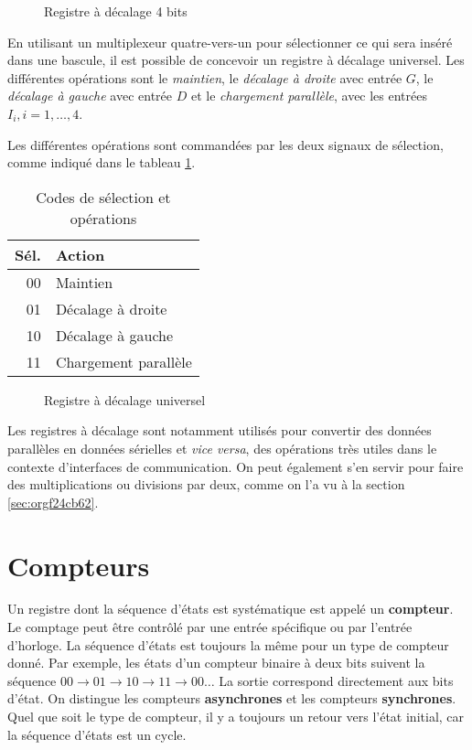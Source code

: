 \documentclass[letter, oneside]{book}
\begin{document}
\begin{enumerate}
\begin{figure}[htbp]
\centering

\caption{\label{fig:orgc7b21b4}Registre à décalage 4 bits}
\end{figure}

En utilisant un multiplexeur quatre-vers-un pour sélectionner ce qui
sera inséré dans une bascule, il est possible de concevoir un registre
à décalage universel. Les différentes opérations sont le \emph{maintien}, le
\emph{décalage à droite} avec entrée \(G\), le \emph{décalage à gauche} avec entrée
\(D\) et le \emph{chargement parallèle}, avec les entrées \(I_i, i=1, \ldots,
4\).

Les différentes opérations sont commandées par les deux signaux de
sélection, comme indiqué dans le tableau \ref{tab:org59d95c8}.

\begin{table}[htbp]
\caption{\label{tab:org59d95c8}Codes de sélection et opérations}
\centering
\begin{tabular}{rl}
Sél. & Action\\[0pt]
\hline
00 & Maintien\\[0pt]
01 & Décalage à droite\\[0pt]
10 & Décalage à gauche\\[0pt]
11 & Chargement parallèle\\[0pt]
\end{tabular}
\end{table}

\begin{figure}[htbp]
\centering

\caption{\label{fig:org26e0237}Registre à décalage universel}
\end{figure} 

Les registres à décalage sont notamment utilisés pour convertir des
données parallèles en données sérielles et \emph{vice versa}, des opérations
très utiles dans le contexte d'interfaces de communication. On peut
également s'en servir pour faire des multiplications ou divisions par
deux, comme on l'a vu à la section \ref{sec:orgf24cb62}.
\end{enumerate}

\section{Compteurs}
\label{sec:org4673aa3}

Un registre dont la séquence d'états est systématique est appelé un
\textbf{compteur}. Le comptage peut être contrôlé par une entrée spécifique
ou par l'entrée d'horloge. La séquence d'états est toujours la même
pour un type de compteur donné. Par exemple, les états d'un compteur
binaire à deux bits suivent la séquence \(00 \rightarrow 01
\rightarrow 10 \rightarrow 11 \rightarrow 00 \ldots\) La sortie
correspond directement aux bits d'état. On distingue les compteurs
\textbf{asynchrones} et les compteurs \textbf{synchrones}. Quel que soit le type de
compteur, il y a toujours un retour vers l'état initial, car la
séquence d'états est un cycle.
\end{document}

